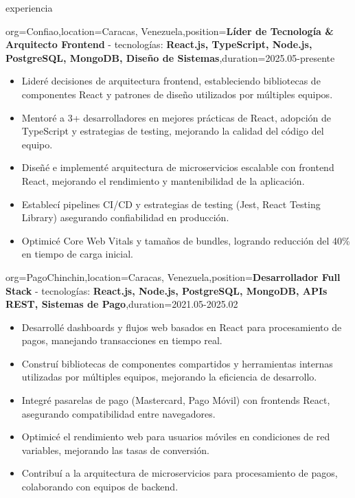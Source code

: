 \documentclass{resume}
\begin{document}
\begin{ResumeSection}{experiencia}
    \begin{ResumeSubsection}{org=Confiao,location={Caracas, Venezuela},position={\textbf{Líder de Tecnología \& Arquitecto Frontend} - tecnologías: \textbf{React.js, TypeScript, Node.js, PostgreSQL, MongoDB, Diseño de Sistemas}},duration=2025.05-presente}
        \begin{itemize}
            \item Lideré decisiones de arquitectura frontend, estableciendo bibliotecas de componentes React y patrones de diseño utilizados por múltiples equipos.
            \item Mentoré a 3+ desarrolladores en mejores prácticas de React, adopción de TypeScript y estrategias de testing, mejorando la calidad del código del equipo.
            \item Diseñé e implementé arquitectura de microservicios escalable con frontend React, mejorando el rendimiento y mantenibilidad de la aplicación.
            \item Establecí pipelines CI/CD y estrategias de testing (Jest, React Testing Library) asegurando confiabilidad en producción.
            \item Optimicé Core Web Vitals y tamaños de bundles, logrando reducción del 40\% en tiempo de carga inicial.
        \end{itemize}
    \end{ResumeSubsection}
    \begin{ResumeSubsection}{org=PagoChinchin,location={Caracas, Venezuela},position={\textbf{Desarrollador Full Stack} - tecnologías: \textbf{React.js, Node.js, PostgreSQL, MongoDB, APIs REST, Sistemas de Pago}},duration=2021.05-2025.02}
        \begin{itemize}
            \item Desarrollé dashboards y flujos web basados en React para procesamiento de pagos, manejando transacciones en tiempo real.
            \item Construí bibliotecas de componentes compartidos y herramientas internas utilizadas por múltiples equipos, mejorando la eficiencia de desarrollo.
            \item Integré pasarelas de pago (Mastercard, Pago Móvil) con frontends React, asegurando compatibilidad entre navegadores.
            \item Optimicé el rendimiento web para usuarios móviles en condiciones de red variables, mejorando las tasas de conversión.
            \item Contribuí a la arquitectura de microservicios para procesamiento de pagos, colaborando con equipos de backend.

\end{itemize}
\end{ResumeSubsection}
\end{ResumeSection}
\end{document}
